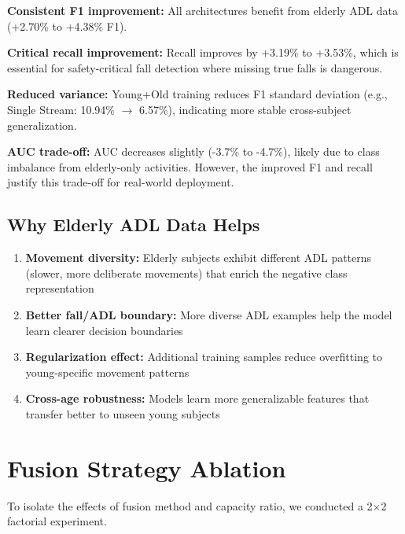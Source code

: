 \documentclass{article}
\begin{document}
\begin{tcolorbox}[colback=green!5,colframe=green!50!black,title=\textbf{Age-Diverse Training Improves All Models}]
\textbf{Consistent F1 improvement:} All architectures benefit from elderly ADL data (+2.70\% to +4.38\% F1).

\textbf{Critical recall improvement:} Recall improves by +3.19\% to +3.53\%, which is essential for safety-critical fall detection where missing true falls is dangerous.

\textbf{Reduced variance:} Young+Old training reduces F1 standard deviation (e.g., Single Stream: 10.94\% $\rightarrow$ 6.57\%), indicating more stable cross-subject generalization.

\textbf{AUC trade-off:} AUC decreases slightly (-3.7\% to -4.7\%), likely due to class imbalance from elderly-only activities. However, the improved F1 and recall justify this trade-off for real-world deployment.
\end{tcolorbox}

\subsection{Why Elderly ADL Data Helps}

\begin{enumerate}
    \item \textbf{Movement diversity:} Elderly subjects exhibit different ADL patterns (slower, more deliberate movements) that enrich the negative class representation
    \item \textbf{Better fall/ADL boundary:} More diverse ADL examples help the model learn clearer decision boundaries
    \item \textbf{Regularization effect:} Additional training samples reduce overfitting to young-specific movement patterns
    \item \textbf{Cross-age robustness:} Models learn more generalizable features that transfer better to unseen young subjects
\end{enumerate}

\section{Fusion Strategy Ablation}

To isolate the effects of fusion method and capacity ratio, we conducted a 2$\times$2 factorial experiment.
\end{document}
